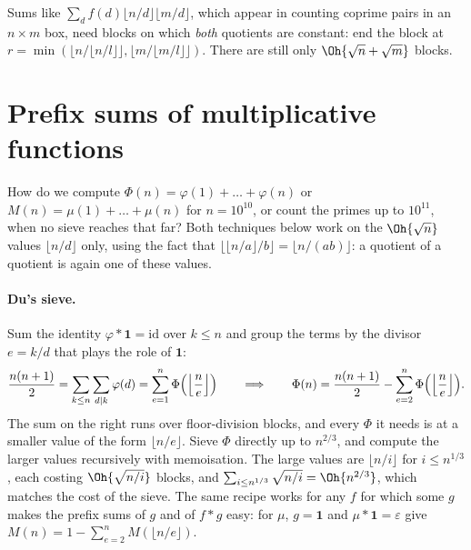 \begin{trick}
Sums like $\sum_d f(d) \lfloor n/d \rfloor \lfloor m/d \rfloor$, which appear in counting coprime pairs in an $n \times m$ box, need
blocks on which \emph{both} quotients are constant: end the block at $r = \min(\lfloor n / \lfloor n/l \rfloor \rfloor, \lfloor m /
\lfloor m/l \rfloor \rfloor)$. There are still only $\Oh{\sqrt n + \sqrt m}$ blocks.
\end{trick}

\section[Prefix sums of multiplicative functions]{Prefix sums of multiplicative functions \hfill \ioi}\label{sec:dusieve}

How do we compute $\Phi(n) = \varphi(1) + \dots + \varphi(n)$ or $M(n) = \mu(1) + \dots + \mu(n)$ for $n = 10^{10}$, or count the primes
up to $10^{11}$, when no sieve reaches that far? Both techniques below work on the $\Oh{\sqrt n}$ values $\lfloor n/d \rfloor$ only,
using the fact that $\lfloor \lfloor n/a \rfloor / b \rfloor = \lfloor n/(ab) \rfloor$: a quotient of a quotient is again one of these
values.

\paragraph{Du's sieve.} Sum the identity $\varphi * \mathbf{1} = \mathrm{id}$ over $k \le n$ and group the terms by the divisor $e = k/d$
that plays the role of $\mathbf{1}$:
\[
  \frac{n(n+1)}{2} = \sum_{k \le n} \sum_{d \mid k} \varphi(d) = \sum_{e=1}^{n} \Phi\Bigl(\Bigl\lfloor \frac{n}{e} \Bigr\rfloor\Bigr)
  \qquad\Longrightarrow\qquad
  \Phi(n) = \frac{n(n+1)}{2} - \sum_{e=2}^{n} \Phi\Bigl(\Bigl\lfloor \frac{n}{e} \Bigr\rfloor\Bigr) .
\]
The sum on the right runs over floor-division blocks, and every $\Phi$ it needs is at a smaller value of the form $\lfloor n/e
\rfloor$. Sieve $\Phi$ directly up to $n^{2/3}$, and compute the larger values recursively with memoisation. The large values are
$\lfloor n/i \rfloor$ for $i \le n^{1/3}$, each costing $\Oh{\sqrt{n/i}}$ blocks, and $\sum_{i \le n^{1/3}} \sqrt{n/i} =
\Oh{n^{2/3}}$, which matches the cost of the sieve. The same recipe works for any $f$ for which some $g$ makes the prefix sums of $g$
and of $f * g$ easy: for $\mu$, $g = \mathbf{1}$ and $\mu * \mathbf{1} = \varepsilon$ give $M(n) = 1 - \sum_{e=2}^{n} M(\lfloor n/e
\rfloor)$.

